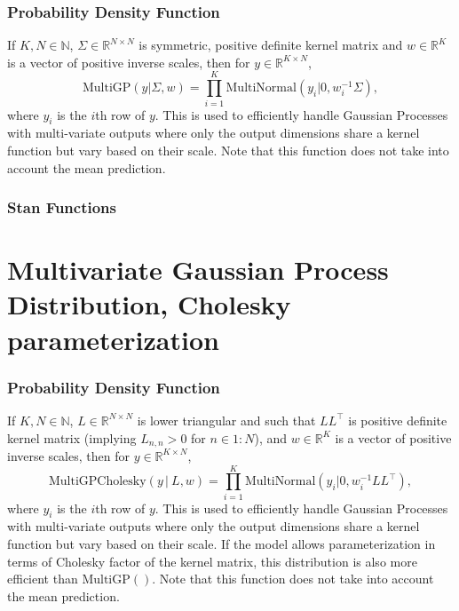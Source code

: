 \begin{description}
\subsubsection{Probability Density Function}


If $K,N \in \mathbb{N}$, $\Sigma \in \mathbb{R}^{N \times N}$ is symmetric, positive definite kernel matrix and $w \in \mathbb{R}^{K}$ is a vector of positive inverse scales, then for $y \in \mathbb{R}^{K \times N}$, \[ \text{MultiGP}(y|\Sigma,w) = \prod_{i=1}^{K} \text{MultiNormal}(y_i|0,w_i^{-1} \Sigma), \] where $y_i$ is the $i$th row of $y$.  This is used to efficiently handle Gaussian Processes with multi-variate outputs where only the output dimensions share a kernel function but vary based on their scale.  Note that this function does not take into account the mean prediction.




\subsubsection{Stan Functions}


\begin{description}  \end{description}


\section{Multivariate Gaussian Process Distribution, Cholesky parameterization}


\subsubsection{Probability Density Function}


If $K,N \in \mathbb{N}$, $L \in \mathbb{R}^{N \times N}$ is lower triangular and such that $LL^{\top}$ is positive definite kernel matrix (implying $L_{n,n} > 0$ for $n \in 1{:}N$), and $w \in \mathbb{R}^{K}$ is a vector of positive inverse scales, then for $y \in \mathbb{R}^{K \times N}$, \[ \text{MultiGPCholesky}(y \, | \ L,w) = \prod_{i=1}^{K} \text{MultiNormal}(y_i|0,w_i^{-1} LL^{\top}), \] where $y_i$ is the $i$th row of $y$.  This is used to efficiently handle Gaussian Processes with multi-variate outputs where only the output dimensions share a kernel function but vary based on their scale.  If the model allows parameterization in terms of Cholesky factor of the kernel matrix, this distribution is also more efficient than $\text{MultiGP}()$. Note that this function does not take into account the mean prediction.



\end{description}
